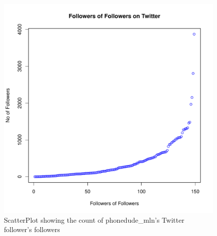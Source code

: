 \begin{figure}
	 \begin{center}
		\includegraphics[scale=0.8]{q1/q1-scatterplot.pdf}
		\caption{ScatterPlot showing the count of phonedude\_mln's Twitter follower's followers }
		\label{fig:q1-2}
 	\end{center}
\end{figure}